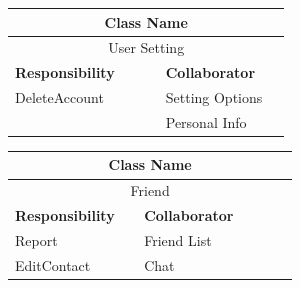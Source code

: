 \documentclass[a4paper]{article}
\begin{document}
	\noindent\begin{minipage}{\textwidth}
		\begin{minipage}[t]{0.48\textwidth}
	 	\centering
		\makeatletter{}\makeatother\caption*{}
		  	\begin{tabular}{|p{0.48\linewidth}|p{0.40\linewidth}|} 
	   			\hline
				\multicolumn{2}{|c|}{\textbf{Class Name}} \\
				\hline
				\multicolumn{2}{|c|}{User Setting} \\
				\hline
				\textbf{Responsibility} & \textbf{Collaborator} \\
				\hline
				DeleteAccount& Setting Options\\
				& Personal Info\\
				\hline
	   		\end{tabular}
	 	\end{minipage}
	 	\begin{minipage}[t]{0.48\textwidth}
		\centering
		\makeatletter{}\makeatother\caption*{}
			\begin{tabular}{|p{0.40\linewidth}|p{0.48\linewidth}|} 
				\hline
				\multicolumn{2}{|c|}{\textbf{Class Name}} \\
				\hline
				\multicolumn{2}{|c|}{Friend} \\
				\hline
				\textbf{Responsibility} & \textbf{Collaborator} \\
				\hline
				Report & Friend List\\
				EditContact & Chat\\
				\hline
			\end{tabular}
		\end{minipage}
   	\end{minipage}
\end{document}
